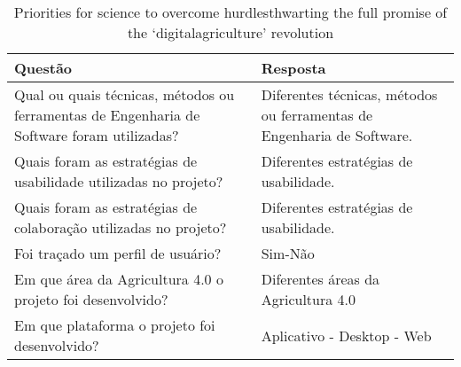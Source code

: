 \documentclass[12pt]{article}
\begin{document}
\begin{table}[!htb]
	\footnotesize
  \centering
	\begin{tabular}{|p{8cm}|p{6cm}|}
		\hline
		\textbf{Questão}                                                                           & \textbf{Resposta}                                                      \\ \hline
		Qual ou quais técnicas, métodos ou ferramentas de Engenharia de Software foram utilizadas? & Diferentes técnicas, métodos ou ferramentas de Engenharia de Software. \\ \hline
		Quais foram as estratégias de usabilidade utilizadas no projeto?                           & Diferentes estratégias de usabilidade.                                 \\ \hline
		Quais foram as estratégias de colaboração utilizadas no projeto?                           & Diferentes estratégias de usabilidade.                                 \\ \hline
		Foi traçado um perfil de usuário?                                                          & Sim-Não                                                                \\ \hline
		Em que área da Agricultura 4.0 o projeto foi desenvolvido?                                 & Diferentes áreas da Agricultura 4.0                                    \\ \hline
		Em que plataforma o projeto foi desenvolvido?                                              & Aplicativo - Desktop - Web                                 \\ \hline
		\end{tabular}
  \caption{Priorities for science to overcome hurdlesthwarting the full promise of the ‘digitalagriculture’ revolution}
  \label{tab:extracao3}
\end{table}
\end{document}
